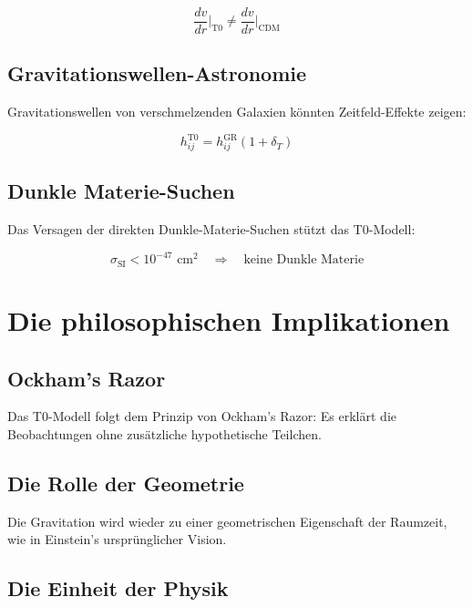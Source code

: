\documentclass[12pt,a4paper]{report}
\begin{document}
	\begin{equation}
		\frac{dv}{dr}\bigg|_{\text{T0}} \neq \frac{dv}{dr}\bigg|_{\text{CDM}}
	\end{equation}
	
	\subsection{Gravitationswellen-Astronomie}
	
	Gravitationswellen von verschmelzenden Galaxien könnten Zeitfeld-Effekte zeigen:
	
	\begin{equation}
		h_{ij}^{\text{T0}} = h_{ij}^{\text{GR}} \left(1 + \delta_T\right)
	\end{equation}
	
	\subsection{Dunkle Materie-Suchen}
	
	Das Versagen der direkten Dunkle-Materie-Suchen stützt das T0-Modell:
	
	\begin{equation}
		\sigma_{\text{SI}} < 10^{-47} \text{ cm}^2 \quad \Rightarrow \quad \text{keine Dunkle Materie}
	\end{equation}
	
	\section{Die philosophischen Implikationen}
	
	\subsection{Ockham's Razor}
	
	Das T0-Modell folgt dem Prinzip von Ockham's Razor: Es erklärt die Beobachtungen ohne zusätzliche hypothetische Teilchen.
	
	\subsection{Die Rolle der Geometrie}
	
	Die Gravitation wird wieder zu einer geometrischen Eigenschaft der Raumzeit, wie in Einstein's ursprünglicher Vision.
	
	\subsection{Die Einheit der Physik}
	
\end{document}
